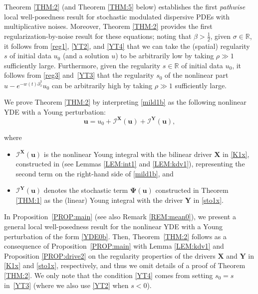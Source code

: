 \documentclass[letterpaper, 11pt,  reqno]{amsart}
\newcommand{\1}{\hspace{0.5mm}\textup{I}\hspace{0.5mm}}
\newcommand{\I}{\mathcal{I}}
\newcommand{\noi}{\noindent}
\newcommand{\R}{\mathbb{R}}
\newcommand{\be}{\beta}
\newcommand{\s}{\sigma}
\newcommand{\dx}{\partial_x}
\newcommand{\uu}{\mathbf{u}}
\newcommand{\PPsi}{\pmb{\Psi}}
\newcommand{\XX}{\mathbf{X}}
\newcommand{\YY}{\mathbf{Y}}
\numberwithin{equation}{section}
\numberwithin{theorem}{section}
\begin{document}
Theorem \ref{THM:2} 
(and Theorem \ref{THM:5} below)
establishes
the first {\it pathwise} local well-posedness 
result for stochastic modulated dispersive PDEs
with multiplicative noises.
Moreover, 
Theorem \ref{THM:2} provides
the first regularization-by-noise
result for these equations;
noting that $\be > \frac 12$, 
given $\s \in \R$, 
it follows from 
 \eqref{reg1}, 
\eqref{YT2}, and
\eqref{YT4} that we can take
the (spatial) regularity~$s$
of initial data $u_0$ (and a solution $u$) 
to be arbitrarily low
by taking $\rho \gg1$ sufficiently large.
Furthermore, given the regularity
$s \in \R$ of initial data $u_0$, 
it follows
from 
 \eqref{reg3} and~\eqref{YT3} that 
the regularity $s_0$ of the nonlinear part
$ u - e^{-w(t) \dx^3}u_0$
can be  arbitrarily high
by taking $\rho \gg1$ sufficiently large.










We prove Theorem \ref{THM:2} by 
interpreting 
\eqref{mild1b}
as the following nonlinear YDE
with a Young perturbation:
\begin{equation}
\uu = u_0 + \I^\XX(\uu) + \I^\YY(\uu), 
\label{YDE0b}
\end{equation}

\noi
where 

\smallskip
\begin{itemize}
\item
$\I^\XX(\uu)$ is the nonlinear Young integral 
with the bilinear driver $\XX$ in \eqref{K1x}, 
constructed in \cite{CGLLO1}
(see Lemmas \ref{LEM:int1} and \ref{LEM:kdv1}), representing
the second term on the right-hand side of \eqref{mild1b}, and

\smallskip
\item 
$\I^\YY(\uu)$
denotes the stochastic term $\PPsi(\uu)$
constructed in Theorem \ref{THM:1}
as the (linear) Young integral
with the driver $\YY$  in 
\eqref{sto1x}. 

\end{itemize}

\smallskip


\noi
In  Proposition~\ref{PROP:main}
(see also Remark \ref{REM:mean0}), 
 we present a  general local well-posedness result
for the nonlinear YDE 
with a Young perturbation 
of the form  \eqref{YDE0b}.
Then, Theorem~\ref{THM:2} follows
as a consequence of 
Proposition~\ref{PROP:main}
with 
 Lemma \ref{LEM:kdv1} and 
 Proposition \ref{PROP:drive2}
 on the regularity properties
 of the drivers $\XX$ and $\YY$
 in \eqref{K1x} and \eqref{sto1x}, respectively, 
 and thus we omit details of a proof of Theorem \ref{THM:2}.
We only note that 
 the  condition \eqref{YT4}
 comes from 
setting $s_0 = s$ in~\eqref{YT3}
 (where we also use \eqref{YT2} when $s < 0$).
\end{document}
